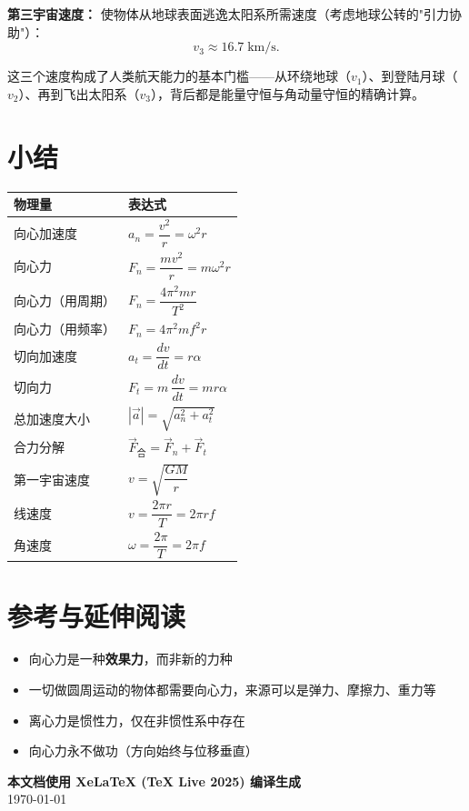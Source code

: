 \documentclass[12pt,a4paper]{article}
\begin{document}
\textbf{第三宇宙速度：} 使物体从地球表面逃逸太阳系所需速度（考虑地球公转的"引力协助"）：
\[
v_3 \approx 16.7\;\text{km/s}.
\]

这三个速度构成了人类航天能力的基本门槛——从环绕地球（$v_1$）、到登陆月球（$v_2$）、再到飞出太阳系（$v_3$），背后都是能量守恒与角动量守恒的精确计算。

\section{小结}

\begin{longtable}{p{3cm}p{10.5cm}}
\toprule
\textbf{物理量} & \textbf{表达式} \\
\midrule
\endhead
向心加速度 & $a_n = \dfrac{v^2}{r} = \omega^2 r$ \\
向心力 & $F_n = \dfrac{mv^2}{r} = m\omega^2 r$ \\
向心力（用周期） & $F_n = \dfrac{4\pi^2mr}{T^2}$ \\
向心力（用频率） & $F_n = 4\pi^2mf^2r$ \\
切向加速度 & $a_t = \dfrac{dv}{dt} = r\alpha$ \\
切向力 & $F_t = m\,\dfrac{dv}{dt} = mr\alpha$ \\
总加速度大小 & $|\vec{a}| = \sqrt{a_n^2 + a_t^2}$ \\
合力分解 & $\vec{F}_{\text{合}} = \vec{F}_n + \vec{F}_t$ \\
第一宇宙速度 & $v = \sqrt{\dfrac{GM}{r}}$ \\
线速度 & $v = \dfrac{2\pi r}{T} = 2\pi rf$ \\
角速度 & $\omega = \dfrac{2\pi}{T} = 2\pi f$ \\
\bottomrule
\end{longtable}

\section*{参考与延伸阅读}

\begin{itemize}
\item 向心力是一种\textbf{效果力}，而非新的力种
\item 一切做圆周运动的物体都需要向心力，来源可以是弹力、摩擦力、重力等
\item 离心力是惯性力，仅在非惯性系中存在
\item 向心力永不做功（方向始终与位移垂直）
\end{itemize}

\vfill
\begin{center}
\textbf{本文档使用 XeLaTeX (TeX Live 2025) 编译生成} \\
\today
\end{center}
\end{document}
